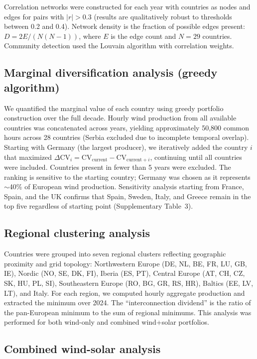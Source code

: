 \documentclass{article}
\begin{document}
Correlation networks were constructed for each year with countries as nodes and edges for pairs with $|r| > 0.3$ (results are qualitatively robust to thresholds between 0.2 and 0.4). Network density is the fraction of possible edges present: $D = 2E / (N(N-1))$, where $E$ is the edge count and $N = 29$ countries. Community detection used the Louvain algorithm \citep{blondel2008} with correlation weights.

\subsection{Marginal diversification analysis (greedy algorithm)}

We quantified the marginal value of each country using greedy portfolio construction over the full decade. Hourly wind production from all available countries was concatenated across years, yielding approximately 50,800 common hours across 28 countries (Serbia excluded due to incomplete temporal overlap). Starting with Germany (the largest producer), we iteratively added the country $i$ that maximized $\Delta\text{CV}_i = \text{CV}_{\text{current}} - \text{CV}_{\text{current} + i}$, continuing until all countries were included. Countries present in fewer than 5 years were excluded. The ranking is sensitive to the starting country; Germany was chosen as it represents $\sim$40\% of European wind production. Sensitivity analysis starting from France, Spain, and the UK confirms that Spain, Sweden, Italy, and Greece remain in the top five regardless of starting point (Supplementary Table~3).

\subsection{Regional clustering analysis}

Countries were grouped into seven regional clusters reflecting geographic proximity and grid topology: Northwestern Europe (DE, NL, BE, FR, LU, GB, IE), Nordic (NO, SE, DK, FI), Iberia (ES, PT), Central Europe (AT, CH, CZ, SK, HU, PL, SI), Southeastern Europe (RO, BG, GR, RS, HR), Baltics (EE, LV, LT), and Italy. For each region, we computed hourly aggregate production and extracted the minimum over 2024. The ``interconnection dividend'' is the ratio of the pan-European minimum to the sum of regional minimums. This analysis was performed for both wind-only and combined wind+solar portfolios.

\subsection{Combined wind-solar analysis}
\end{document}
